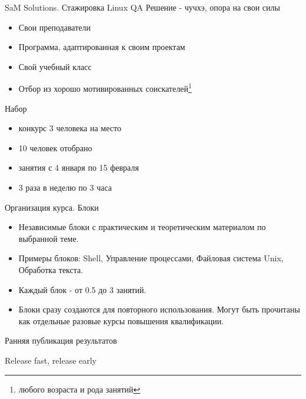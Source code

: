 \begin{frame}{SaM Solutions. Стажировка Linux QA}
  \alert{Решение - чучхэ, опора на свои силы}

  \begin{itemize}
    \item Свои преподаватели
    \item Программа, адаптированная к своим проектам
    \item Свой учебный класс
    \item Отбор из хорошо мотивированных соискателей\footnote{любого возраста и рода занятий}
  \end{itemize} \pause


  \alert{Набор}
  \begin{itemize}
    \item конкурс 3 человека на место
    \item 10 человек отобрано
    \item занятия с 4 января по 15 февраля
    \item 3 раза в неделю по 3 часа
  \end{itemize}

\end{frame}

\begin{frame}{Организация курса. Блоки}
  
  \begin{itemize}
    \item Независимые блоки с практическим и теоретическим материалом по выбранной теме.
    \item Примеры блоков: Shell, Управление процессами, Файловая система Unix, Обработка текста.
    \item Каждый блок - от 0.5 до 3 занятий.
    \item Блоки сразу создаются для повторного использования.  \newline
  Могут быть прочитаны как отдельные разовые курсы повышения квалификации.
  \end{itemize}

\end{frame}

\begin{frame}{Ранняя публикация результатов}

  \Huge
  \alert{Release fast, release early}
  
\end{frame}
